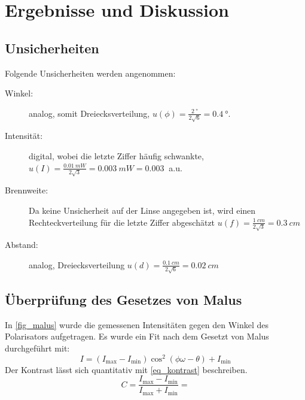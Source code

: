 \documentclass[
	a4paper,
	12pt,
	pagesize,
	ngerman
]{scrartcl}
\begin{document}
	\section{Ergebnisse und Diskussion}
		\subsection*{Unsicherheiten}

	Folgende Unsicherheiten werden angenommen:
	\begin{description}
		\item[Winkel:] analog, somit Dreiecksverteilung, $u(\phi)=\frac{\SI{2}{\degree}}{2\sqrt{6}}=\SI{0.4}{\degree}$.
		\item[Intensität:] digital, wobei die letzte Ziffer häufig schwankte, $u(I)=\frac{\SI{0.01}{mW}}{2\sqrt{3}}=\SI{0.003}{mW}=\SI{0.003}{}$ a.u.
		\item[Brennweite:] Da keine Unsicherheit auf der Linse angegeben ist, wird einen Rechteckverteilung für die letzte Ziffer abgeschätzt $u(f)=\frac{\SI{1}{cm}}{2\sqrt{3}}= \SI{0.3}{cm}$
		\item[Abstand:] analog, Dreiecksverteilung $u(d)=\frac{\SI{0.1}{cm}}{2\sqrt{6}}= \SI{0.02}{cm}$
	\end{description}
		\subsection{Überprüfung des Gesetzes von Malus}\label{ss_malus}
		In \cref{fig_malus} wurde die gemessenen Intensitäten gegen den Winkel des Polarisators aufgetragen.
		Es wurde ein Fit nach dem Gesetzt von Malus durchgeführt mit:
		\begin{equation}
			I = (I_\text{max}-I_\text{min})\cos^2(\phi\omega-\theta) +I_\text{min}
		\end{equation}
		Der Kontrast lässt sich quantitativ mit \cref{eq_kontrast} beschreiben.
		\begin{equation}
			\label{eq_kontrast}
			C = \frac{I_\text{max}-I_\text{min}}{I_\text{max}+I_\text{min}}= 
		\end{equation}
\end{document}
